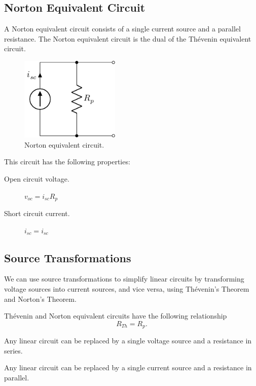 \documentclass{article}
\begin{document}
\subsection{Norton Equivalent Circuit}
\begin{definition}
    A Norton equivalent circuit consists of a single current source and
    a parallel resistance. The Norton equivalent circuit is the dual of
    the Thévenin equivalent circuit.
    \begin{figure}[H]
        \centering
        \includegraphics[height = 4cm, keepaspectratio = true]{figures/norton_equivalent.pdf}
        \caption{Norton equivalent circuit.}
    \end{figure}
    This circuit has the following properties:
    \begin{description}
        \item[Open circuit voltage.] \(v_{oc} = i_{sc}R_{p}\)
        \item[Short circuit current.] \(i_{sc} = i_{sc}\)
    \end{description}
\end{definition}
\subsection{Source Transformations}
We can use source transformations to simplify linear circuits by
transforming voltage sources into current sources, and vice versa,
using Thévenin's Theorem and Norton's Theorem.
\begin{theorem}
    Thévenin and Norton equivalent circuits have the following
    relationship
    \begin{equation*}
        R_{Th} = R_{p}.
    \end{equation*}
\end{theorem}
\begin{theorem}
    Any linear circuit can be replaced by a single voltage source and a resistance in series.
\end{theorem}
\begin{theorem}
    Any linear circuit can be replaced by a single current source and a resistance in parallel.
\end{theorem}
\end{document}

